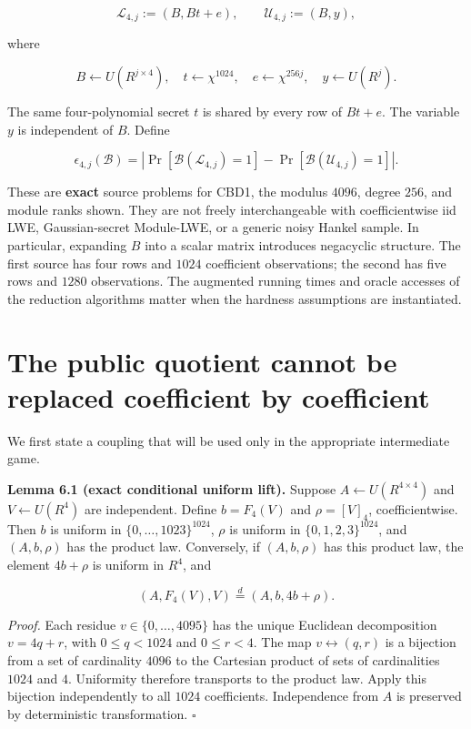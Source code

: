 \documentclass[
  11pt,
  a4paper,
  oneside]{report}
\begin{document}
\[
\mathcal L_{4,j}:=(B,Bt+e),\qquad
\mathcal U_{4,j}:=(B,y),
\]

where

\[
B\leftarrow U(R^{j\times4}),\quad
t\leftarrow\chi^{1024},\quad
e\leftarrow\chi^{256j},\quad
y\leftarrow U(R^j).
\]

The same four-polynomial secret \(t\) is shared by every row of
\(Bt+e\). The variable \(y\) is independent of \(B\). Define

\[
\epsilon_{4,j}(\mathcal B)=
\left|\Pr[\mathcal B(\mathcal L_{4,j})=1]
-\Pr[\mathcal B(\mathcal U_{4,j})=1]\right|.
\]

These are \textbf{exact} source problems for CBD1, the modulus \(4096\),
degree \(256\), and module ranks shown. They are not freely
interchangeable with coefficientwise iid LWE, Gaussian-secret
Module-LWE, or a generic noisy Hankel sample. In particular, expanding
\(B\) into a scalar matrix introduces negacyclic structure. The first
source has four rows and \(1024\) coefficient observations; the second
has five rows and \(1280\) observations. The augmented running times and
oracle accesses of the reduction algorithms matter when the hardness
assumptions are instantiated.

\section{The public quotient cannot be replaced coefficient by
coefficient}\label{the-public-quotient-cannot-be-replaced-coefficient-by-coefficient}

We first state a coupling that will be used only in the appropriate
intermediate game.

\textbf{Lemma 6.1 (exact conditional uniform lift).} Suppose
\(A\leftarrow U(R^{4\times4})\) and \(V\leftarrow U(R^4)\) are
independent. Define \(b=F_4(V)\) and \(\rho=[V]_4\), coefficientwise.
Then \(b\) is uniform in \(\{0,\ldots,1023\}^{1024}\), \(\rho\) is
uniform in \(\{0,1,2,3\}^{1024}\), and \((A,b,\rho)\) has the product
law. Conversely, if \((A,b,\rho)\) has this product law, the element
\(4b+\rho\) is uniform in \(R^4\), and

\[
(A,F_4(V),V)\overset{d}= (A,b,4b+\rho).
\]

\emph{Proof.} Each residue \(v\in\{0,\ldots,4095\}\) has the unique
Euclidean decomposition \(v=4q+r\), with \(0\le q<1024\) and
\(0\le r<4\). The map \(v\leftrightarrow(q,r)\) is a bijection from a
set of cardinality \(4096\) to the Cartesian product of sets of
cardinalities \(1024\) and \(4\). Uniformity therefore transports to the
product law. Apply this bijection independently to all \(1024\)
coefficients. Independence from \(A\) is preserved by deterministic
transformation. \(\square\)
\end{document}

